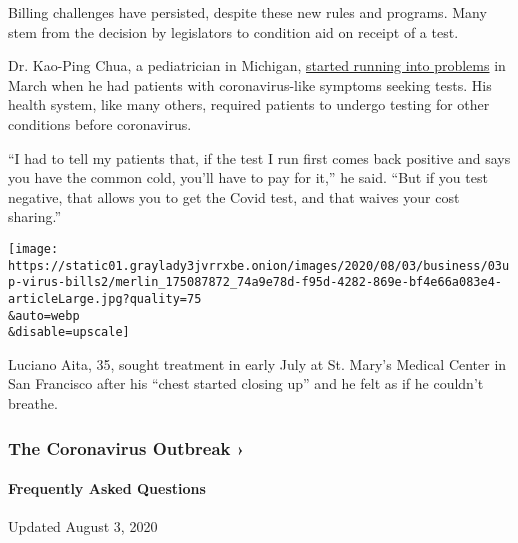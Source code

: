 Billing challenges have persisted, despite these new rules and programs.
Many stem from the decision by legislators to condition aid on receipt
of a test.

Dr. Kao-Ping Chua, a pediatrician in Michigan,
\href{https://www.healthaffairs.org/do/10.1377/hblog20200413.783118/full/}{started
running into problems} in March when he had patients with
coronavirus-like symptoms seeking tests. His health system, like many
others, required patients to undergo testing for other conditions before
coronavirus.

``I had to tell my patients that, if the test I run first comes back
positive and says you have the common cold, you'll have to pay for it,''
he said. ``But if you test negative, that allows you to get the Covid
test, and that waives your cost sharing.''

\texttt{[image: https://static01.graylady3jvrrxbe.onion/images/2020/08/03/business/03up-virus-bills2/merlin\_175087872\_74a9e78d-f95d-4282-869e-bf4e66a083e4-articleLarge.jpg?quality=75\\\&auto=webp\\\&disable=upscale]}

Luciano Aita, 35, sought treatment in early July at St. Mary's Medical
Center in San Francisco after his ``chest started closing up'' and he
felt as if he couldn't breathe.

\href{https://www.nytimes3xbfgragh.onion/news-event/coronavirus?action=click\&pgtype=Article\&state=default\&region=MAIN_CONTENT_3\&context=storylines_faq}{}

\hypertarget{the-coronavirus-outbreak-}{%
\subsubsection{The Coronavirus Outbreak
›}\label{the-coronavirus-outbreak-}}

\hypertarget{frequently-asked-questions}{%
\paragraph{Frequently Asked
Questions}\label{frequently-asked-questions}}

Updated August 3, 2020

